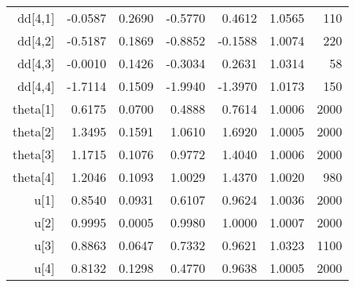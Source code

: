 \begin{table}[ht]
\begin{tabular}{rrrrrrr}
  dd[4,1] & -0.0587 & 0.2690 & -0.5770 & 0.4612 & 1.0565 &   110 \\ 
  dd[4,2] & -0.5187 & 0.1869 & -0.8852 & -0.1588 & 1.0074 &   220 \\ 
  dd[4,3] & -0.0010 & 0.1426 & -0.3034 & 0.2631 & 1.0314 &    58 \\ 
  dd[4,4] & -1.7114 & 0.1509 & -1.9940 & -1.3970 & 1.0173 &   150 \\ 
  theta[1] & 0.6175 & 0.0700 & 0.4888 & 0.7614 & 1.0006 &  2000 \\ 
  theta[2] & 1.3495 & 0.1591 & 1.0610 & 1.6920 & 1.0005 &  2000 \\ 
  theta[3] & 1.1715 & 0.1076 & 0.9772 & 1.4040 & 1.0006 &  2000 \\ 
  theta[4] & 1.2046 & 0.1093 & 1.0029 & 1.4370 & 1.0020 &   980 \\ 
  u[1] & 0.8540 & 0.0931 & 0.6107 & 0.9624 & 1.0036 &  2000 \\ 
  u[2] & 0.9995 & 0.0005 & 0.9980 & 1.0000 & 1.0007 &  2000 \\ 
  u[3] & 0.8863 & 0.0647 & 0.7332 & 0.9621 & 1.0323 &  1100 \\ 
  u[4] & 0.8132 & 0.1298 & 0.4770 & 0.9638 & 1.0005 &  2000 \\ 
   \hline
\end{tabular}
\end{table}
